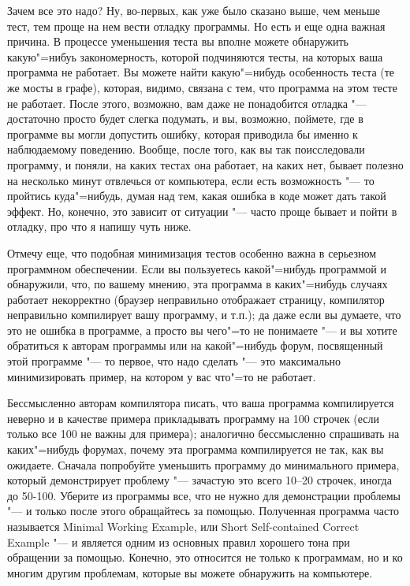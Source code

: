\documentclass[a4paper,10pt]{problems}
\begin{document}
Зачем все это надо?
Ну, во-первых, как уже было сказано выше, чем меньше тест, тем проще на нем вести отладку программы.
Но есть и еще одна важная причина. 
В процессе уменьшения теста вы вполне можете обнаружить какую"=нибуь закономерность, которой подчиняются тесты, на которых ваша программа не работает.
Вы можете найти какую"=нибудь особенность теста (те же мосты в графе), которая, видимо, связана с тем, что программа на этом тесте не работает.
После этого, возможно, вам даже не понадобится отладка "--- достаточно просто будет слегка подумать, и вы, возможно, поймете, где в программе
вы могли допустить ошибку, которая приводила бы именно к наблюдаемому поведению.
Вообще, после того, как вы так поисследовали программу, и поняли, на каких тестах она работает, на каких нет, бывает полезно на несколько минут отвлечься
от компьютера, если есть возможность "--- то пройтись куда"=нибудь, думая над тем, какая ошибка в коде может дать такой эффект. 
Но, конечно, это зависит от ситуации "--- часто проще бывает и пойти в отладку, про что я напишу чуть ниже.

Отмечу еще, что подобная минимизация тестов особенно важна в серьезном программном обеспечении. 
Если вы пользуетесь какой"=нибудь программой и обнаружили, что, по вашему мнению, эта программа в каких"=нибудь случаях работает некорректно
(браузер неправильно отображает страницу, компилятор неправильно компилирует вашу программу, и т.п.); да даже если вы думаете, что это не ошибка в программе,
а просто вы чего"=то не понимаете "--- и вы хотите обратиться к авторам программы или на какой"=нибудь форум, посвященный этой программе "--- 
то первое, что надо сделать "--- это максимально минимизировать пример, на котором у вас что"=то не работает.

Бессмысленно авторам компилятора писать, что ваша программа компилируется неверно и в качестве примера прикладывать программу на 100 строчек 
(если только все 100 не важны для примера); аналогично бессмысленно спрашивать на каких"=нибудь форумах, почему эта программа компилируется не так,
как вы ожидаете. 
Сначала попробуйте уменьшить программу до минимального примера, который демонстрирует проблему "--- зачастую это всего 10--20 строчек, иногда
до 50-100. 
Уберите из программы все, что не нужно для демонстрации проблемы "--- и только после этого обращайтесь за помощью. 
Полученная программа часто называется Minimal Working Example, или Short Self-contained Correct Example "--- и является одним из
основных правил хорошего тона при обращении за помощью.
Конечно, это относится не только к программам, но и ко многим другим проблемам, которые вы можете обнаружить на компьютере.
\end{document}
